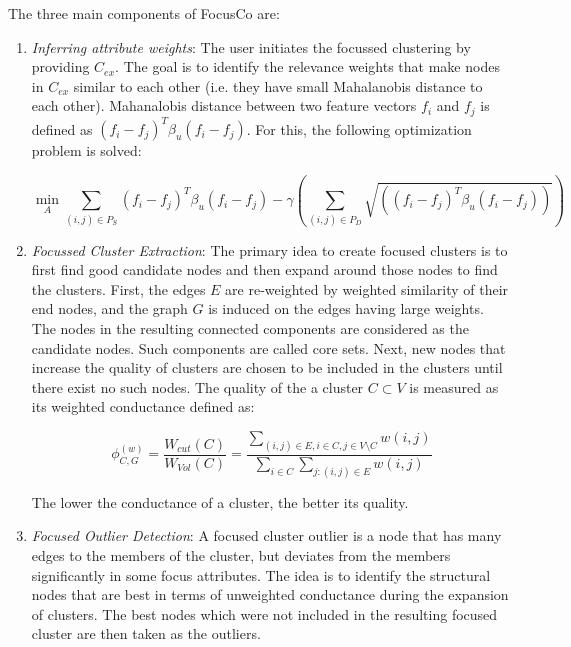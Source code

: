 \documentclass[11pt, oneside]{article}   	%
\begin{document}
\quad The three main components of FocusCo are:
\begin{enumerate}
\item \emph{Inferring attribute weights}: 
The user initiates the focussed clustering by providing $C_{ex}$.
The goal is to identify the relevance weights that make nodes in $C_{ex}$ similar to each other (i.e. they have small Mahalanobis distance to each other).
Mahanalobis distance between two feature vectors $f_i$ and $f_j$ is defined as $(f_i - f_j)^T\beta_u(f_i-f_j)$. For this, the following optimization problem is solved:

\begin{equation*}
\min_{A} \sum_{(i,j) \in P_S}(f_i - f_j)^T\beta_u(f_i-f_j) - \gamma \left( \sum_{(i,j) \in P_D} \sqrt{((f_i - f_j)^T\beta_u(f_i-f_j))} \right)
\end{equation*}  

\item \emph{Focussed Cluster Extraction}: 
The primary idea to create focused clusters is to first find good candidate nodes and then expand around those nodes to find the clusters.
First, the edges $E$ are re-weighted by weighted similarity of their end nodes, and the graph $G$ is induced on the edges having large weights.
The nodes in the resulting connected components are considered as the candidate nodes. Such components are called core sets.
Next, new nodes that increase the quality of clusters are chosen to be included in the clusters until there exist no such nodes.
The quality of the a cluster $C \subset V$ is measured as its weighted conductance defined as:

\begin{equation*}
\phi^{(w)}_{C, G} = \frac{W_{cut}(C)}{W_{Vol}(C)} = \frac {\sum\limits_{(i,j)\in E, i\in C, j\in V\setminus C}w(i,j)} 
														  {\sum\limits_{i\in C} \sum\limits_{j:(i,j)\in E}w(i,j)}
\end{equation*}

The lower the conductance of a cluster, the better its quality.

\item \emph{Focused Outlier Detection}:
A focused cluster outlier is a node that has many edges to the members of the cluster, but deviates from the members significantly in some focus attributes.
The idea is to identify the structural nodes that are best in terms of unweighted conductance during the expansion of clusters.
The best nodes which were not included in the resulting focused cluster are then taken as the outliers.
\end{enumerate}
\end{document}
